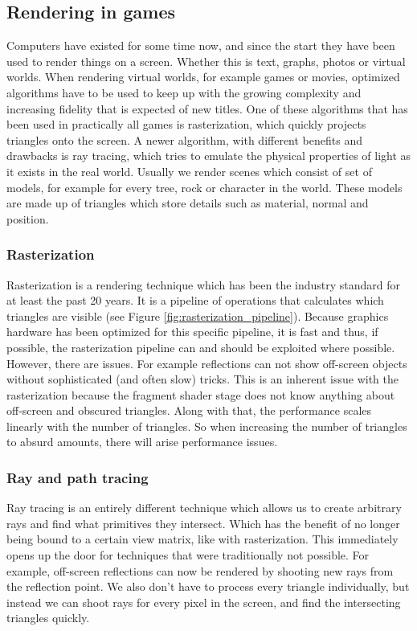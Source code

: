\subsection{Rendering in games} \label{related_work:rendering}
Computers have existed for some time now, and since the start they have been used to render things on a screen. Whether this is text, graphs, photos or virtual worlds. When rendering virtual worlds, for example games or movies, optimized algorithms have to be used to keep up with the growing complexity and increasing fidelity that is expected of new titles. One of these algorithms that has been used in practically all games is rasterization, which quickly projects triangles onto the screen. A newer algorithm, with different benefits and drawbacks is ray tracing, which tries to emulate the physical properties of light as it exists in the real world. Usually we render scenes which consist of set of models, for example for every tree, rock or character in the world. These models are made up of triangles which store details such as material, normal and position.

\subsubsection{Rasterization} \label{related_work:rendering:rasterization}
Rasterization is a rendering technique which has been the industry standard for at least the past 20 years. It is a pipeline of operations that calculates which triangles are visible (see Figure \ref{fig:rasterization_pipeline}). Because graphics hardware has been optimized for this specific pipeline, it is fast and thus, if possible, the rasterization pipeline can and should be exploited where possible. However, there are issues. For example reflections can not show off-screen objects without sophisticated (and often slow) tricks. This is an inherent issue with the rasterization because the fragment shader stage does not know anything about off-screen and obscured triangles. Along with that, the performance scales linearly with the number of triangles. So when increasing the number of triangles to absurd amounts, there will arise performance issues.

\subsubsection{Ray and path tracing} \label{related_work:rendering:ray_tracing}
Ray tracing is an entirely different technique which allows us to create arbitrary rays and find what primitives they intersect. Which has the benefit of no longer being bound to a certain view matrix, like with rasterization. This immediately opens up the door for techniques that were traditionally not possible. For example, off-screen reflections can now be rendered by shooting new rays from the reflection point. We also don't have to process every triangle individually, but instead we can shoot rays for every pixel in the screen, and find the intersecting triangles quickly.

